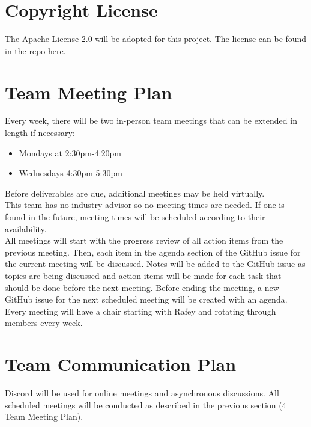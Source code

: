\documentclass{article}
\begin{document}
\section{Copyright License}

The Apache License 2.0 will be adopted for this project. The license can be found in the repo \href{https://github.com/russellrd/realm/blob/main/LICENSE}{here}.

\section{Team Meeting Plan} \label{team_meeting_plan}

Every week, there will be two in-person team meetings that can be extended in length if necessary:
\begin{itemize}
    \item Mondays at 2:30pm-4:20pm
    \item Wednesdays 4:30pm-5:30pm
\end{itemize}

Before deliverables are due, additional meetings may be held virtually. \\

This team has no industry advisor so no meeting times are needed. If one is found in the future, meeting times will be scheduled according to their availability. \\

All meetings will start with the progress review of all action items from the previous meeting. Then, each item in the agenda section of the GitHub issue for the current meeting will be discussed. Notes will be added to the GitHub issue as topics are being discussed and action items will be made for each task that should be done before the next meeting. Before ending the meeting, a new GitHub issue for the next scheduled meeting will be created with an agenda. \\

Every meeting will have a chair starting with Rafey and rotating through members every week.

\section{Team Communication Plan} \label{team_communication_plan}

Discord will be used for online meetings and asynchronous discussions. All scheduled meetings will be conducted as described in the previous section (4 Team Meeting Plan). \\
\end{document}
